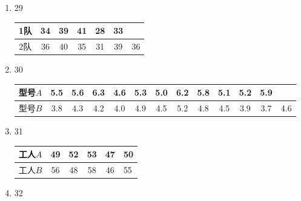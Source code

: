 \documentclass[10pt,a4paper]{article}
\begin{document}
\begin{enumerate}
    \item 29    
    \renewcommand{\arraystretch}{1.3}
    \begin{table}[H]\centering
        \begin{tabular}{c|cccccc}
        1队 & 34 & 39 & 41 & 28 & 33 &    \\ \hline
        2队 & 36 & 40 & 35 & 31 & 39 & 36
        \end{tabular}
    \end{table}
    \renewcommand{\arraystretch}{1.0}




    



    \item 30
    
    \renewcommand{\arraystretch}{1.3}
    \begin{table}[H]\centering
        \begin{tabular}{c|cccccccccccc}
        型号$A$ & 5.5 & 5.6 & 6.3 & 4.6 & 5.3 & 5.0 & 6.2 & 5.8 & 5.1 & 5.2 & 5.9 &     \\ \hline
        型号$B$ & 3.8 & 4.3 & 4.2 & 4.0 & 4.9 & 4.5 & 5.2 & 4.8 & 4.5 & 3.9 & 3.7 & 4.6
        \end{tabular}
    \end{table}
    \renewcommand{\arraystretch}{1.0}





    \item 31
    \renewcommand{\arraystretch}{1.3}
    \begin{table}[H]\centering
        \begin{tabular}{c|ccccl}
        工人$A$ & 49 & 52 & 53 & 47 & 50 \\ \hline
        工人$B$ & 56 & 48 & 58 & 46 & 55
        \end{tabular}
    \end{table}
    \renewcommand{\arraystretch}{1.0}






    \item 32




  

\end{enumerate}
\end{document}
